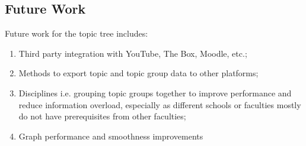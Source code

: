 \subsection{Future Work}
Future work for the topic tree includes:

\begin{enumerate}
    \item Third party integration with YouTube, The Box, Moodle, etc.;
    \item Methods to export topic and topic group data to other platforms;
    \item Disciplines i.e. grouping topic groups together to improve performance and reduce information overload, especially as different schools or faculties mostly do not have prerequisites from other faculties;
    \item Graph performance and smoothness improvements
\end{enumerate} 

